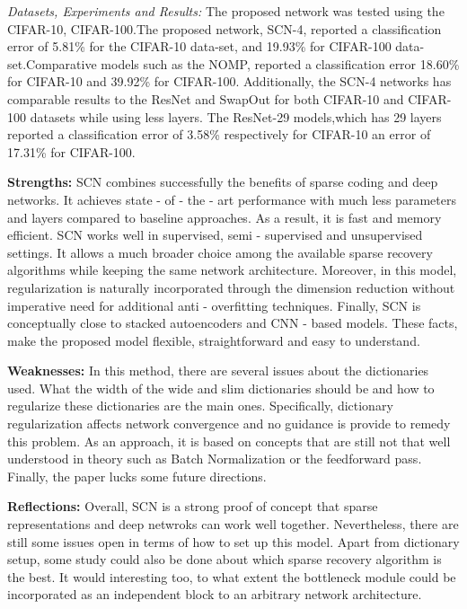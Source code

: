 \documentclass[10pt,twocolumn,letterpaper]{article}
\begin{document}
\noindent\textit{Datasets, Experiments and Results:} The proposed network was tested using the CIFAR-10, CIFAR-100.The proposed network, SCN-4, reported a classification error of 5.81\% for the CIFAR-10 data-set, and 19.93\% for CIFAR-100 data-set.Comparative models such as the NOMP, reported a classification error  18.60\% for  CIFAR-10 and 39.92\% for CIFAR-100. Additionally, the SCN-4 networks has comparable results to the ResNet and SwapOut for both CIFAR-10 and CIFAR-100 datasets while using less layers. The ResNet-29 models,which has 29 layers reported a classification error of 3.58\% respectively for CIFAR-10 an error of  17.31\% for CIFAR-100.

\noindent\textbf{Strengths:} SCN combines successfully the benefits of sparse coding and deep networks. It achieves state - of - the - art performance with much less parameters and layers compared to baseline approaches. As a result, it is fast and memory efficient. SCN works well in supervised, semi - supervised and unsupervised settings. It allows a much broader choice among the available sparse recovery algorithms while keeping the same network architecture. Moreover, in this model, regularization is naturally incorporated through the dimension reduction without imperative need for additional anti - overfitting techniques. Finally, SCN is conceptually close to stacked autoencoders and CNN - based models. These facts, make the proposed model flexible, straightforward and easy to understand.

\noindent\textbf{Weaknesses:} In this method, there are several issues about the dictionaries used. What the width of the wide and slim dictionaries should be and how to regularize these dictionaries are the main ones. Specifically, dictionary regularization affects network convergence and no guidance is provide to remedy this problem. As an approach, it is based on concepts that are still not that well understood in theory such as Batch Normalization or the feedforward pass. Finally, the paper lucks some future directions.

\noindent\textbf{Reflections:} Overall, SCN is a strong proof of concept that sparse representations and deep netwroks can work well together. Nevertheless, there are still some issues open in terms of how to set up this model. Apart from dictionary setup, some study could also be done about which sparse recovery algorithm is the best. It would interesting too, to what extent the bottleneck module could be incorporated as an independent block to an arbitrary network architecture.

{\small
	
	
}
\end{document}
